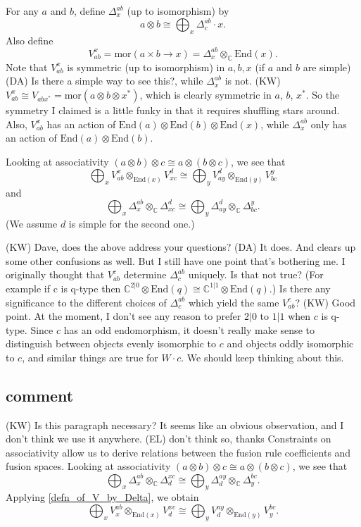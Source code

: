 \documentclass[12pt,a4paper]{article}
\newcommand{\tp}{\otimes}
\newcommand{\cc}{\mathbb{C}}
\newcommand\be            {\begin{equation}}
\newcommand\ee            {\end{equation}}
\newcommand{\mor}{\text{mor}}
\newcommand{\End}{\text{End}}
\newcommand{\kw}[1]{{\color{kwcolor}\footnotesize{(KW) #1}}}
\newcommand{\dave}[1]{{\color{ao(english)}\footnotesize{(DA) #1}}}
\newcommand{\ethan}[1]{{\color{amethyst}\footnotesize{(EL) #1}}}
\begin{document}
For any $a$ and $b$, define $\Delta^{ab}_x$ (up to isomorphism) by
\be
	a \otimes b \cong \bigoplus_x \Delta^{ab}_c \cdot x .
\ee
Also define
\be
	V_{ab}^x = \mor(a\times b \to x) = \Delta^{ab}_x \otimes_\cc \End(x).
\ee
Note that $V_{ab}^x$ is symmetric (up to isomorphism) in $a,b,x$ (if $a$ and $b$ are simple) \dave{Is there a simple way to see this?}, while
$\Delta^{ab}_x$ is not.
\kw{$V_{ab}^x \cong V_{abx^*} = \mor(a\otimes b\otimes x^*)$, which is clearly symmetric in $a$, $b$, $x^*$.
So the symmetry I claimed is a little funky in that it requires shuffling stars around.}
Also, $V_{ab}^x$ has an action of $\End(a)\otimes\End(b)\otimes\End(x)$, while $\Delta^{ab}_x$
only has an action of $\End(a)\otimes\End(b)$.

Looking at associativity $(a\otimes b)\otimes c \cong a\otimes (b\otimes c)$, we see that
\be
	\bigoplus_x V_{ab}^x \otimes_{\End(x)} V_{xc}^d \cong \bigoplus_y V_{ay}^d \otimes_{\End(y)} V_{bc}^y
\ee
and
\be
	\bigoplus_x \Delta^{ab}_x \otimes_\cc \Delta_{xc}^d \cong \bigoplus_y \Delta_{ay}^d \otimes_\cc \Delta_{bc}^y .
\ee
(We assume $d$ is simple for the second one.)

\kw{Dave, does the above address your questions?
\dave{It does. And clears up some other confusions as well.
 But I still have one point that's bothering me.
I originally thought that $V_{ab}^c$ determine $\Delta^{ab}_c$ uniquely.
Is that not true?
(For example if c is q-type then $\mathbb{C}^{2|0} \tp \text{End}(q) \cong \mathbb{C}^{1|1} \tp \text{End}(q)$.)
Is there any significance to the different choices of $\Delta^{ab}_c$ which yield the same $V_{ab}^c$?}}
\kw{Good point.
At the moment, I don't see any reason to prefer $2|0$ to $1|1$ when $c$ is q-type.
Since $c$ has an odd endomorphism, it doesn't really make sense to distinguish between objects evenly
isomorphic to $c$ and objects oddly isomorphic to $c$, and similar things are true for $W\cdot c$.
We should keep thinking about this.}
 
 


 
\subsection{comment}
\kw{Is this paragraph necessary?  It seems like an obvious observation, and I don't think we use it anywhere.}
\ethan{don't think so, thanks}
Constraints on associativity allow us to derive relations between the fusion rule coefficients and fusion spaces. 
Looking at associativity $(a\otimes b)\otimes c \cong a\otimes (b\otimes c)$, we see that
\be
	\bigoplus_x \Delta^{ab}_x \otimes_\cc \Delta^{xc}_d \cong \bigoplus_y \Delta^{ay}_d \otimes_\cc \Delta^{bc}_y.
\ee
Applying \eqref{defn_of_V_by_Delta}, we obtain
\be
	\bigoplus_x V^{ab}_x \otimes_{\End(x)} V^{xc}_d \cong \bigoplus_y V^{ay}_d \otimes_{\End(y)} V^{bc}_y .
\ee
 
\end{document}
